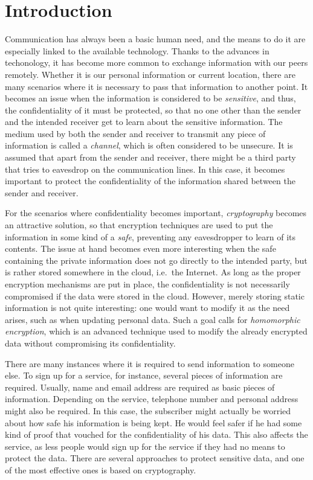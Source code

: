 \chapter{Introduction}
\label{intro}

Communication has always been a basic human need, and the means to do it are especially linked to the available technology. Thanks to the advances in techonology, it has become more common to exchange information with our peers remotely. Whether it is our personal information or current location, there are many scenarios where it is necessary to pass that information to another point. It becomes an issue when the information is considered to be \emph{sensitive}, and thus, the confidentiality of it must be protected, so that no one other than the sender and the intended receiver get to learn about the sensitive information. The medium used by both the sender and receiver to transmit any piece of information is called a \emph{channel}, which is often considered to be unsecure. It is assumed that apart from the sender and receiver, there might be a third party that tries to eavesdrop on the communication lines. In this case, it becomes important to protect the confidentiality of the information shared between the sender and receiver. 

For the scenarios where confidentiality becomes important, \emph{cryptography} becomes an attractive solution, so that encryption techniques are used to put the information in some kind of a \emph{safe}, preventing any eavesdropper to learn of its contents. The issue at hand becomes even more interesting when the safe containing the private information does not go directly to the intended party, but is rather stored somewhere in the cloud, i.e.\ the Internet. As long as the proper encryption mechanisms are put in place, the confidentiality is not necessarily compromised if the data were stored in the cloud. However, merely storing static information is not quite interesting: one would want to modify it as the need arises, such as when updating personal data. Such a goal calls for \emph{homomorphic encryption}, which is an advanced technique used to modify the already encrypted data without compromising its confidentiality.

There are many instances where it is required to send information to someone else. To sign up for a service, for instance, several pieces of information are required. Usually, name and email address are required as basic pieces of information. Depending on the service, telephone number and personal address might also be required. In this case, the subscriber might actually be worried about how safe his information is being kept. He would feel safer if he had some kind of proof that vouched for the confidentiality of his data. This also affects the service, as less people would sign up for the service if they had no means to protect the data. There are several approaches to protect sensitive data, and one of the most effective ones is based on cryptography.

